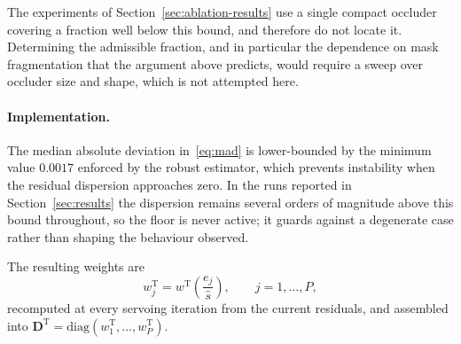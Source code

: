 The experiments of Section~\ref{sec:ablation-results} use a single compact
occluder covering a fraction well below this bound, and therefore do not
locate it. Determining the admissible fraction, and in particular the
dependence on mask fragmentation that the argument above predicts, would
require a sweep over occluder size and shape, which is not attempted here.

\paragraph{Implementation.}
The median absolute deviation in~\eqref{eq:mad} is lower-bounded by the
minimum value $0.0017$ enforced by the robust estimator, which prevents
instability when the residual dispersion approaches zero. In the runs reported
in Section~\ref{sec:results} the dispersion remains several orders of
magnitude above this bound throughout, so the floor is never active; it
guards against a degenerate case rather than shaping the behaviour observed.

The resulting weights are
\begin{equation}
    w^{\mathrm{T}}_{j}=w^{\mathrm{T}}\!\left(\frac{e_{j}}{\hat{s}}\right),
    \qquad j=1,\dots,P,
    \label{eq:tukey-weights}
\end{equation}
recomputed at every servoing iteration from the current residuals, and
assembled into
$\mathbf{D}^{\mathrm{T}}=\mathrm{diag}(w^{\mathrm{T}}_{1},\dots,w^{\mathrm{T}}_{P})$.

%
%
%
%
